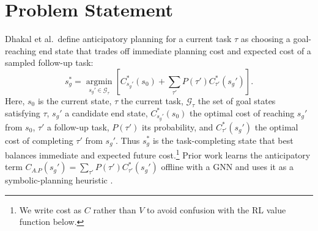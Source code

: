\documentclass{article}
\begin{document}
\section{Problem Statement}
Dhakal et al.\ define anticipatory planning for a current task $\tau$ as choosing a goal-reaching end state that trades off immediate planning cost and expected cost of a sampled follow-up task:
\begin{equation}
\label{eq:dhakal}
s_g^*=\operatorname*{argmin}_{s_g' \in \mathcal{G}_\tau}\left[C^*_{s_g'}(s_0)+\sum_{\tau'} P(\tau')C^*_{\tau'}(s_g')\right].
\end{equation}
Here, $s_0$ is the current state, $\tau$ the current task, $\mathcal{G}_\tau$ the set of goal states satisfying $\tau$, $s_g'$ a candidate end state, $C^*_{s_g'}(s_0)$ the optimal cost of reaching $s_g'$ from $s_0$, $\tau'$ a follow-up task, $P(\tau')$ its probability, and $C^*_{\tau'}(s_g')$ the optimal cost of completing $\tau'$ from $s_g'$. Thus $s_g^*$ is the task-completing state that best balances immediate and expected future cost.\footnote{We write cost as $C$ rather than $V$ to avoid confusion with the RL value function below.} Prior work learns the anticipatory term \( C_{A.P}(s_g') = \sum_{\tau'} P(\tau')C^*_{\tau'}(s_g') \) offline with a GNN and uses it as a symbolic-planning heuristic \cite{dhakal2023anticipatory}.
\end{document}
